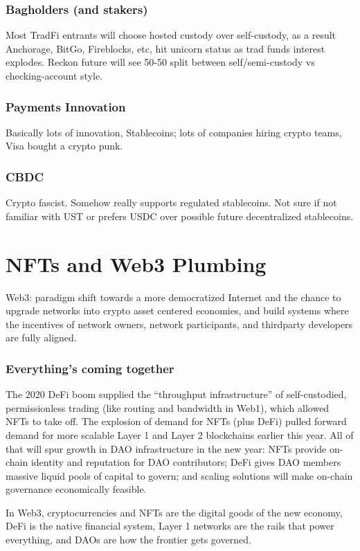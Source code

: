 \documentclass{../notes}
\begin{document}
\section{Bagholders (and stakers)}
Most TradFi entrants will choose hosted custody over self-custody, as a result Anchorage, BitGo, Fireblocks, etc, hit unicorn status as trad funds interest explodes. Reckon future will see 50-50 split between self/semi-custody vs checking-account style. 

\section{Payments Innovation}
Basically lots of innovation, Stablecoins; lots of companies hiring crypto teams, Visa bought a crypto punk. 

\section{CBDC}
Crypto fascist. Somehow really supports regulated stablecoins. Not sure if not familiar with UST or prefers USDC over possible future decentralized stablecoins. 

\part{NFTs and Web3 Plumbing}
Web3: paradigm shift towards a more democratized Internet and the chance to upgrade networks into crypto asset centered economies, and build systems where the incentives of network owners, network participants, and thirdparty developers are fully aligned. 

\section{Everything's coming together}
The 2020 DeFi boom supplied the “throughput infrastructure” of self-custodied, permissionless trading (like routing and bandwidth in Web1), which allowed NFTs to take off. The explosion of demand for NFTs (plus DeFi) pulled forward demand for more scalable Layer 1 and Layer 2 blockchains earlier this year. All of that will spur growth in DAO infrastructure in the new year: NFTs provide on-chain identity and reputation for DAO contributors; DeFi gives DAO members massive liquid pools of capital to govern; and scaling solutions will make on-chain governance economically feasible.

In Web3, cryptocurrencies and NFTs are the digital goods of the new economy, DeFi is the native financial system, Layer 1 networks are the rails that power everything, and DAOs are how the frontier gets governed.
\end{document}
